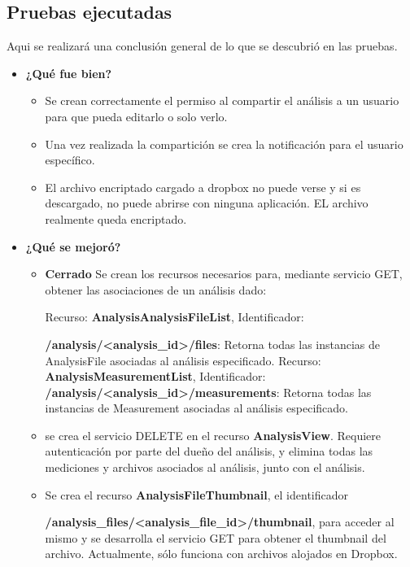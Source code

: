 \subsection{Pruebas ejecutadas}
Aqui se realizará una conclusión general de lo que se descubrió en las pruebas.
	\begin{itemize}
		\item \textbf{¿Qué fue bien?}
        	\begin{itemize}
				\item Se crean correctamente el permiso al compartir el análisis a un usuario para que pueda editarlo o solo verlo.
				\item Una vez realizada la compartición se crea la notificación para el usuario específico.
				\item El archivo encriptado cargado a dropbox no puede verse y si es descargado, no puede abrirse con ninguna aplicación. EL archivo realmente queda encriptado.
			\end{itemize}

   		\item \textbf{¿Qué se mejoró?}
        	\begin{itemize}
                \item \textbf{Cerrado} Se crean los recursos necesarios para, mediante servicio GET, obtener las asociaciones de un análisis dado:
                
                    Recurso: \textbf{AnalysisAnalysisFileList}, Identificador: 
                    
                    \textbf{/analysis/<analysis\_id>/files}: Retorna todas las instancias de AnalysisFile asociadas al análisis especificado.
                    Recurso: \textbf{AnalysisMeasurementList}, Identificador: \textbf{/analysis/<analysis\_id>/measurements}: Retorna todas las instancias de Measurement asociadas al análisis especificado.
                
                \item se crea el servicio DELETE en el recurso \textbf{AnalysisView}. Requiere autenticación por parte del dueño del análisis, y elimina todas las mediciones y archivos asociados al análisis, junto con el análisis.
                
                \item Se crea el recurso \textbf{AnalysisFileThumbnail}, el identificador 
                
                \textbf{/analysis\_files/<analysis\_file\_id>/thumbnail}, para acceder al mismo y se desarrolla el servicio GET para obtener el thumbnail del archivo. Actualmente, sólo funciona con archivos alojados en Dropbox.
                

\end{itemize}
\end{itemize}
